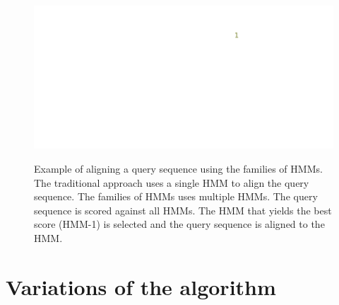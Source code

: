 \begin{figure}[htbp]
\centering
{\includegraphics[width=1.0\textwidth]{hmmfamily/alignment}}
\caption[Example of alignment using HMM families.]{Example of aligning a query sequence using the families of HMMs.  The traditional approach uses a single HMM to align the query sequence.  The families of HMMs uses multiple HMMs.  The query sequence is scored against all HMMs.  The HMM that yields the best score (HMM-1) is selected and the query sequence is aligned to the HMM.} 
\label{hmmfamily:alignment}
\end{figure}


\section{Variations of the algorithm}\label{hmmfamily:modification}


